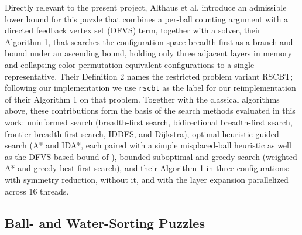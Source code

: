 \documentclass[letterpaper]{article}
\begin{document}
Directly relevant to the present project, Althaus et al.
\cite{althaus2025} introduce an admissible lower bound for this puzzle that
combines a per-ball counting argument with a directed feedback vertex set
(DFVS) term, together with a solver, their Algorithm 1, that searches the
configuration space breadth-first as a branch and bound under an ascending
bound, holding only three adjacent layers in memory and collapsing
color-permutation-equivalent configurations to a single representative.
Their Definition 2 names the restricted problem variant RSCBT; following
our implementation we use \texttt{rscbt} as the label for our
reimplementation of their Algorithm 1 on that problem. Together with the
classical algorithms above, these contributions form the basis of the
search methods evaluated in this work: uninformed search (breadth-first
search, bidirectional breadth-first search, frontier breadth-first search,
IDDFS, and Dijkstra), optimal heuristic-guided search (A* and IDA*, each
paired with a simple misplaced-ball heuristic as well as the DFVS-based
bound of \cite{althaus2025}), bounded-suboptimal and greedy search
(weighted A* and greedy best-first search), and their Algorithm 1 in three
configurations: with symmetry reduction, without it, and with the layer
expansion parallelized across 16 threads.

\subsection{Ball- and Water-Sorting Puzzles}
\end{document}
